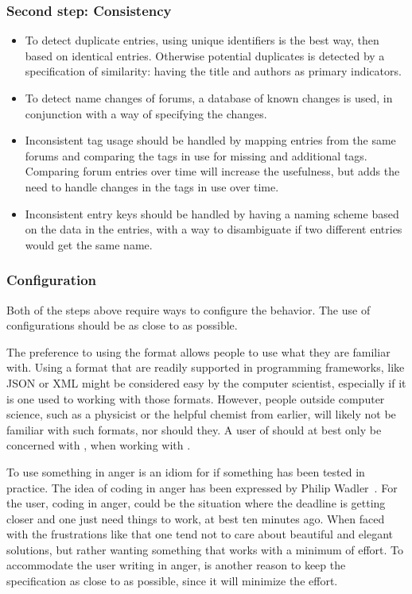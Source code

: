\subsubsection{Second step: Consistency}
\begin{itemize}
\item To detect duplicate entries, using unique identifiers is the
  best way, then based on identical entries.  Otherwise potential
  duplicates is detected by a specification of similarity: having the
  title and authors as primary indicators.

\item To detect name changes of forums, a database of known changes is
  used, in conjunction with a way of specifying the changes.

\item Inconsistent tag usage should be handled by mapping entries from
  the same forums and comparing the tags in use for missing and
  additional tags.  Comparing forum entries over time will increase
  the usefulness, but adds the need to handle changes in the tags in
  use over time.

\item Inconsistent entry keys should be handled by having a naming
  scheme based on the data in the entries, with a way to disambiguate
  if two different entries would get the same name.
\end{itemize}


\subsubsection{Configuration}

Both of the steps above require ways to configure the behavior.  The
use of configurations should be as close to {\bibtex} as possible.

The preference to using the {\bibtex} format allows people to use what
they are familiar with.  Using a format that are readily supported in
programming frameworks, like JSON or XML might be considered easy by
the computer scientist, especially if it is one used to working with
those formats.  However, people outside computer science, such as a
physicist or the helpful chemist from earlier, will likely not be
familiar with such formats, nor should they.  A user of {\bibtex}
should at best only be concerned with {\bibtex}, when working with
{\bibtex}.

To use something in anger is an idiom for if something has been tested
in practice.  The idea of coding in anger has been expressed by Philip
Wadler~\cite{wadler1997_functional}.  For the {\bibtex} user, coding
in anger, could be the situation where the deadline is getting closer
and one just need things to work, at best ten minutes ago.  When faced
with the frustrations like that one tend not to care about beautiful
and elegant solutions, but rather wanting something that works with a
minimum of effort.  To accommodate the user writing {\bibtex} in
anger, is another reason to keep the specification as close to
{\bibtex} as possible, since it will minimize the effort.

